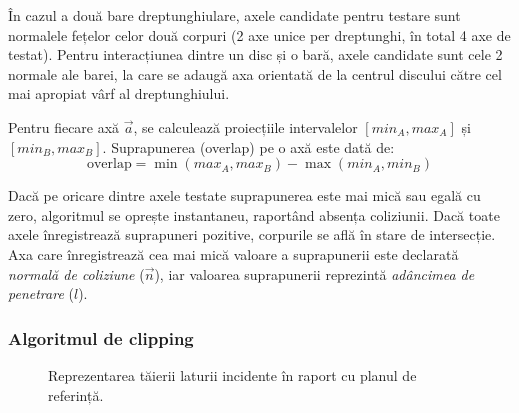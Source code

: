\documentclass[12pt, a4paper]{article}
\begin{document}
În cazul a două bare dreptunghiulare, axele candidate pentru testare sunt normalele fețelor celor două corpuri (2 axe unice per dreptunghi, în total 4 axe de testat). Pentru interacțiunea dintre un disc și o bară, axele candidate sunt cele 2 normale ale barei, la care se adaugă axa orientată de la centrul discului către cel mai apropiat vârf al dreptunghiului.

Pentru fiecare axă $\vec{a}$, se calculează proiecțiile intervalelor $[min_A, max_A]$ și $[min_B, max_B]$. Suprapunerea (overlap) pe o axă este dată de:
$$ \text{overlap} = \min(max_A, max_B) - \max(min_A, min_B) $$

Dacă pe oricare dintre axele testate suprapunerea este mai mică sau egală cu zero, algoritmul se oprește instantaneu, raportând absența coliziunii. Dacă toate axele înregistrează suprapuneri pozitive, corpurile se află în stare de intersecție. Axa care înregistrează cea mai mică valoare a suprapunerii este declarată \textit{normală de coliziune} ($\vec{n}$), iar valoarea suprapunerii reprezintă \textit{adâncimea de penetrare} ($l$).

\subsubsection{Algoritmul de clipping }

\begin{figure}[h]
\centering
{}
\caption{Reprezentarea tăierii laturii incidente în raport cu planul de referință.}
\end{figure}
\end{document}
